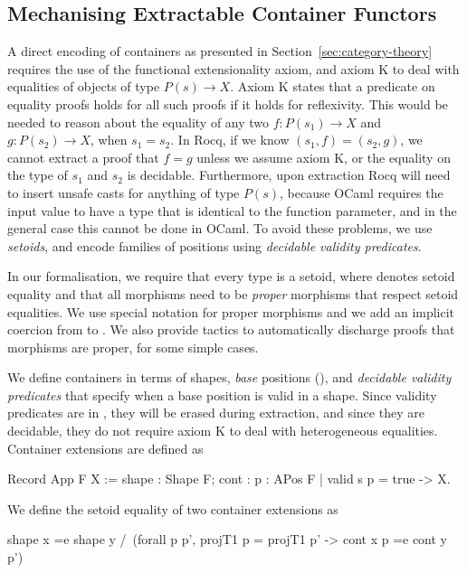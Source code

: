 \documentclass[a4paper,UKenglish,cleveref, autoref, thm-restate]{lipics-v2021}
\begin{document}
\subsection{Mechanising Extractable Container Functors}
\label{sec:containers}
A direct encoding of containers as presented in
Section~\ref{sec:category-theory} requires the use of the functional
extensionality axiom, and axiom K to deal with equalities of objects of type
$P(s) \to X$. Axiom K states that a predicate on equality proofs holds for all
such proofs if it holds for reflexivity. This would be needed to reason about
the equality of any two $f : P(s_1) \to X$ and $g : P(s_2) \to X$, when $s_1 =
s_2$. In Rocq, if we know $(s_1 , f) = (s_2 , g)$, we cannot extract a proof that
$f = g$ unless we assume axiom K, or the equality on the type of $s_1$ and $s_2$
is decidable.  Furthermore, upon extraction Rocq will need to insert unsafe casts
for
anything of type $P(s)$, because OCaml requires the input value to have a type that is identical to the function parameter, and
in the general case this cannot be done in OCaml.
To avoid these problems, we use \emph{setoids}, and
encode families of positions using \emph{decidable validity predicates}.

In our formalisation, we require that every type is a setoid, where 
denotes setoid equality and that all morphisms need to be \emph{proper}
morphisms that respect setoid equalities. We use special notation  
for proper morphisms and we add an implicit coercion from  to
.  We also provide tactics to automatically discharge proofs that
morphisms are proper,  for some simple cases.

We define containers in terms of shapes, \emph{base} positions
(), and \emph{decidable validity predicates} that specify when a
base position is valid in a shape. Since validity predicates are in ,
they will be erased during extraction, and since they are decidable, they do not
require axiom K to deal with heterogeneous equalities.  Container extensions are
defined as
\begin{coqcode}
Record App F X := {shape : Shape F; cont : {p : APos F | valid s p = true} -> X}.
\end{coqcode}
We define the setoid equality of two container extensions  as
\begin{coqcode}
shape x =e shape y /\ (forall p p', projT1 p = projT1 p' -> cont x p =e cont y p')
\end{coqcode}
\end{document}
